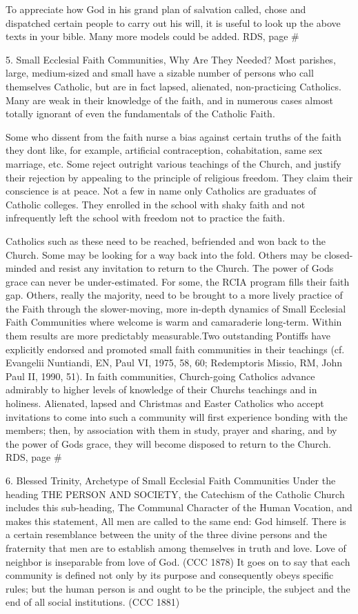 \documentclass[oneside]{book}
\begin{document}
To appreciate how God in his grand plan of salvation called, chose and
dispatched certain people to carry out his will, it is useful to look up the
above texts in your bible. Many more models could be added.  RDS, page \#

5. Small Ecclesial Faith Communities, Why Are They Needed?  Most parishes,
large, medium-sized and small have a sizable number of persons who call
themselves Catholic, but are in fact lapsed, alienated, non-practicing
Catholics. Many are weak in their knowledge of the faith, and in numerous cases
almost totally ignorant of even the fundamentals of the Catholic Faith.

Some who dissent from the faith nurse a bias against certain truths of the faith
they dont like, for example, artificial contraception, cohabitation, same sex
marriage, etc. Some reject outright various teachings of the Church, and justify
their rejection by appealing to the principle of religious freedom. They claim
their conscience is at peace. Not a few in name only Catholics are graduates of
Catholic colleges. They enrolled in the school with shaky faith and not
infrequently left the school with freedom not to practice the faith.

Catholics such as these need to be reached, befriended and won back to the
Church. Some may be looking for a way back into the fold. Others may be
closed-minded and resist any invitation to return to the Church. The power of
Gods grace can never be under-estimated. For some, the RCIA program fills their
faith gap. Others, really the majority, need to be brought to a more lively
practice of the Faith through the slower-moving, more in-depth dynamics of Small
Ecclesial Faith Communities where welcome is warm and camaraderie
long-term. Within them results are more predictably measurable.Two outstanding
Pontiffs have explicitly endorsed and promoted small faith communities in their
teachings (cf. Evangelii Nuntiandi, EN, Paul VI, 1975, 58, 60; Redemptoris
Missio, RM, John Paul II, 1990, 51). In faith communities, Church-going
Catholics advance admirably to higher levels of knowledge of their Churchs
teachings and in holiness. Alienated, lapsed and Christmas and Easter Catholics
who accept invitations to come into such a community will first experience
bonding with the members; then, by association with them in study, prayer and
sharing, and by the power of Gods grace, they will become disposed to return to
the Church.  RDS, page \#

6. Blessed Trinity, Archetype of Small Ecclesial Faith Communities Under the
heading THE PERSON AND SOCIETY, the Catechism of the Catholic Church includes
this sub-heading, The Communal Character of the Human Vocation, and makes this
statement, All men are called to the same end: God himself. There is a certain
resemblance between the unity of the three divine persons and the fraternity
that men are to establish among themselves in truth and love. Love of neighbor
is inseparable from love of God. (CCC 1878) It goes on to say that each
community is defined not only by its purpose and consequently obeys specific
rules; but the human person is and ought to be the principle, the subject and
the end of all social institutions. (CCC 1881)
\end{document}
